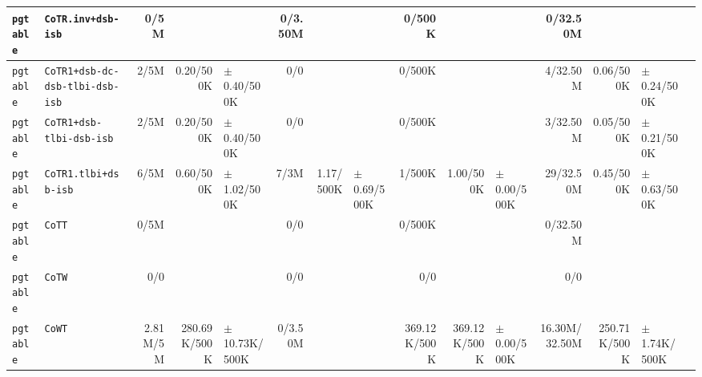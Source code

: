 \begin{tabular}{l l  | r r l | r r l | r r l | r r l l}
     \verb|pgtable| &                                    \verb|CoTR.inv+dsb-isb| &           0/5M &                       &                   &        0/3.50M &                       &                 &         0/500K &                       &                   &       0/32.50M &                       &                   & \\ \hline 
     \verb|pgtable| &                       \verb|CoTR1+dsb-dc-dsb-tlbi-dsb-isb| &           2/5M &             0.20/500K &   $\pm$ 0.40/500K &            0/0 &                       &                 &         0/500K &                       &                   &       4/32.50M &             0.06/500K &   $\pm$ 0.24/500K & \\ \hline 
     \verb|pgtable| &                              \verb|CoTR1+dsb-tlbi-dsb-isb| &           2/5M &             0.20/500K &   $\pm$ 0.40/500K &            0/0 &                       &                 &         0/500K &                       &                   &       3/32.50M &             0.05/500K &   $\pm$ 0.21/500K & \\ \hline 
     \verb|pgtable| &                                  \verb|CoTR1.tlbi+dsb-isb| &           6/5M &             0.60/500K &   $\pm$ 1.02/500K &           7/3M &             1.17/500K & $\pm$ 0.69/500K &         1/500K &             1.00/500K &   $\pm$ 0.00/500K &      29/32.50M &             0.45/500K &   $\pm$ 0.63/500K & \\ \hline 
     \verb|pgtable| &                                                \verb|CoTT| &           0/5M &                       &                   &            0/0 &                       &                 &         0/500K &                       &                   &       0/32.50M &                       &                   & \\ \hline 
     \verb|pgtable| &                                                \verb|CoTW| &            0/0 &                       &                   &            0/0 &                       &                 &            0/0 &                       &                   &            0/0 &                       &                   & \\ \hline 
     \verb|pgtable| &                                                \verb|CoWT| &       2.81M/5M &          280.69K/500K & $\pm$ 10.73K/500K &        0/3.50M &                       &                 &   369.12K/500K &          369.12K/500K &   $\pm$ 0.00/500K &  16.30M/32.50M &          250.71K/500K &  $\pm$ 1.74K/500K & \\ \hline 

\end{tabular}
